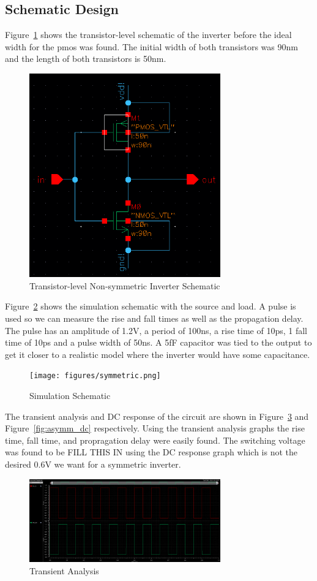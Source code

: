 \documentclass[12pt]{article}
\begin{document}
\subsection{Schematic Design}
Figure~\ref{fig:asymm_schem} shows the transistor-level schematic of the inverter before the ideal width for the pmos was found. The initial width of both transistors was 90nm and the length of both transistors is 50nm.
\begin{figure}[!htb]
  \centering
  \includegraphics[width=3.25in]{figures/asymmetric_schematic.png}
  \caption{Transistor-level Non-symmetric Inverter Schematic}\label{fig:asymm_schem}
\end{figure}
Figure~\ref{fig:sim_schem} shows the simulation schematic with the source and load. A pulse is used so we can measure the rise and fall times as well as the propagation delay. The pulse has an amplitude of 1.2V, a period of 100ns, a rise time of 10ps, 1 fall time of 10ps and a pulse width of 50ns. A 5fF capacitor was tied to the output to get it closer to a realistic model where the inverter would have some capacitance.
\begin{figure}[!htb]
  \centering
  \texttt{[image: figures/symmetric.png]}
  \caption{Simulation Schematic}\label{fig:sim_schem}
\end{figure}
The transient analysis and DC response of the circuit are shown in Figure~\ref{fig:asymm_trans} and Figure~\ref{fig:asymm_dc} respectively. Using the transient analysis graphs the rise time, fall time, and propragation delay were easily found. The switching voltage was found to be FILL THIS IN using the DC response graph which is not the desired 0.6V we want for a symmetric inverter.
\begin{figure}[!htb]
  \centering
  \includegraphics[width=3.25in]{figures/asymmetric_transient.png}
  \caption{Transient Analysis}\label{fig:asymm_trans}
\end{figure}
\end{document}
